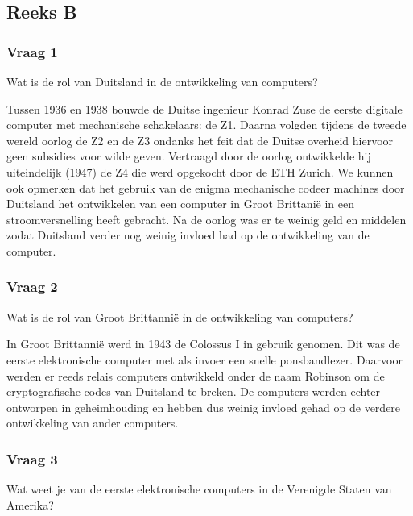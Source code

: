 \documentclass[../main.tex]{subfiles}
\begin{document}
\subsection{Reeks B}
\subsubsection{Vraag 1}
\begin{question}
Wat is de rol van Duitsland in de ontwikkeling van computers?
\end{question}

\begin{solution}
Tussen 1936 en 1938 bouwde de Duitse ingenieur Konrad Zuse de eerste digitale computer met mechanische schakelaars: de Z1.
Daarna volgden tijdens de tweede wereld oorlog de Z2 en de Z3 ondanks het feit dat de Duitse overheid hiervoor geen subsidies voor wilde geven.
Vertraagd door de oorlog ontwikkelde hij uiteindelijk (1947) de Z4 die werd opgekocht door de ETH Zurich.
We kunnen ook opmerken dat het gebruik van de enigma mechanische codeer machines door Duitsland het ontwikkelen van een computer in Groot Brittani\"e in een stroomversnelling heeft gebracht.
Na de oorlog was er te weinig geld en middelen zodat Duitsland verder nog weinig invloed had op de ontwikkeling van de computer.
\end{solution}

\subsubsection{Vraag 2}
\begin{question}
Wat is de rol van Groot Brittanni\"e in de ontwikkeling van computers?
\end{question}
\begin{solution}
In Groot Brittanni\"e werd in 1943 de Colossus I in gebruik genomen. Dit was de eerste elektronische computer met als invoer een snelle ponsbandlezer. 
Daarvoor werden er reeds relais computers ontwikkeld onder de naam Robinson om de cryptografische codes van Duitsland te breken.
De computers werden echter ontworpen in geheimhouding en hebben dus weinig invloed gehad op de verdere ontwikkeling van ander computers.
\end{solution}

\subsubsection{Vraag 3}
\begin{question}
Wat weet je van de eerste elektronische computers in de Verenigde Staten van Amerika?
\end{question}
\end{document}
